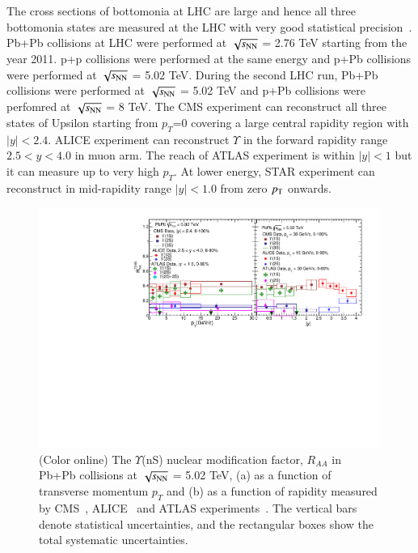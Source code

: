  The cross sections of bottomonia at LHC are large and hence all three 
bottomonia states are measured at the LHC with very good statistical
precision~\cite{Chatrchyan:2011pe,Chatrchyan:2012lxa,Abelev:2014nua,Khachatryan:2016xxp}.
 Pb+Pb collisions at LHC were performed at $\sqrt{s_{\rm NN}}$ = 2.76 TeV starting from 
the year 2011. p+p collisions were performed at the same energy and p+Pb collisions were
performed at $\sqrt{s_{\rm NN}}$ = 5.02 TeV. 
During the second LHC run, Pb+Pb collisions were performed at $\sqrt{s_{\rm NN}}$ = 5.02 TeV 
and p+Pb collisions were perfomred at $\sqrt{s_{\rm NN}}$ = 8 TeV. 
The CMS experiment can reconstruct all three states of Upsilon starting from
$p_T$=0 covering a large central rapidity region with $|y| < 2.4$.
ALICE experiment can reconstruct $\Upsilon$ in the forward rapidity range
$2.5 < y < 4.0$ in muon arm. The reach of ATLAS experiment is within $|y| < 1$ but
it can measure up to very high $p_T$. At lower energy, STAR experiment can reconstruct in mid-rapidity range
$|y| < 1.0$ from zero $p_{\rm T}$ onwards. 

\begin{figure}
  \includegraphics[width=0.99\textwidth]{Figures/Fig5_LHC_YnSRAAPtRap.pdf}
  \caption{(Color online) The $\Upsilon$(nS) nuclear modification factor, $R_{AA}$
in Pb+Pb collisions at $\sqrt{s_{\rm NN}}$ = 5.02 TeV, (a) as a function of transverse momentum $p_{T}$
    and (b) as a function of rapidity measured by CMS~\cite{CMS:2018zza}, ALICE~\cite{ALICE:2020wwx}
    and ATLAS experiments~\cite{ALICE:2020wwx}.
    The vertical bars denote statistical uncertainties, and the rectangular boxes
    show the total systematic uncertainties.
  }
  \label{fig:LHCYnSRAAPtRap}
\end{figure}


